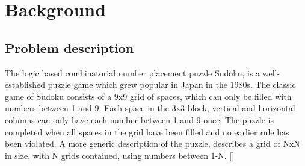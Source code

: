\documentclass[a4paper,11pt]{article}
\begin{document}
\section{Background}

\subsection{Problem description}
The logic based combinatorial number placement puzzle Sudoku, is a well-established puzzle game which grew popular in Japan in the 1980s. The classic game of Sudoku consists of a 9x9 grid of spaces, which can only be filled with numbers between 1 and 9. Each space in the 3x3 block, vertical and horizontal columns can only have each number between 1 and 9 once. The puzzle is completed when all spaces in the grid have been filled and no earlier rule has been violated. A more generic description of the puzzle, describes a grid of NxN in size, with N grids contained, using numbers between 1-N. []
\end{document}
